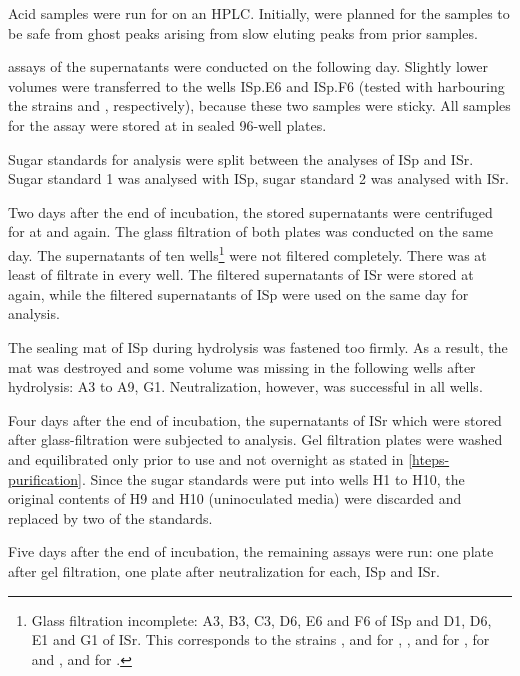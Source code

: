 Acid samples were run for  on an HPLC. Initially,  were planned for the samples to be safe from ghost peaks arising from slow eluting peaks from prior samples.%

\GLC{} assays of the supernatants were conducted on the following day. Slightly lower volumes were transferred to the wells ISp.E6 and ISp.F6 (tested with \fur{} harbouring the strains  and , respectively), because these two samples were sticky. All samples for the \glc{} assay were stored at  in sealed 96-well plates.

Sugar standards for \eps{} \amc{} analysis were split between the analyses of ISp and ISr. Sugar standard 1 was analysed with ISp, sugar standard 2 was analysed with ISr.

Two days after the end of incubation, the stored supernatants were centrifuged for  at  and  again. The  glass filtration of both plates was conducted on the same day. The supernatants of ten wells\footnote{Glass filtration incomplete: A3, B3, C3, D6, E6 and F6 of ISp and D1, D6, E1 and G1 of ISr. This corresponds to the strains ,  and  for \fur{}, ,  and  for \hmf{},  for \acet{} and ,  and  for \fora{}.} were not filtered completely. There was at least  of filtrate in every well. The filtered supernatants of ISr were stored at  again, while the filtered supernatants of ISp were used on the same day for \eps{} \amc{} analysis.

The sealing mat of ISp during hydrolysis was fastened too firmly. As a result, the mat was destroyed and some volume was missing in the following wells after hydrolysis: A3 to A9, G1. Neutralization, however, was successful in all wells.

Four days after the end of incubation, the supernatants of ISr which were stored after glass-filtration were subjected to \eps{} \amc{} analysis. Gel filtration plates were washed and equilibrated only  prior to use and not overnight as stated in \vref{hteps-purification}. Since the sugar standards were put into wells H1 to H10, the original contents of H9 and H10 (uninoculated media) were discarded and replaced by two of the standards.

Five days after the end of incubation, the remaining \glc{} assays were run: one plate after gel filtration, one plate after neutralization for each, ISp and ISr.

